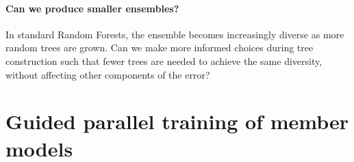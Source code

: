 \documentclass[
	twoside=false, %
]{kaobook}
\begin{document}
\paragraph{Can we produce smaller ensembles?} In standard Random Forests, the ensemble becomes increasingly diverse as more random trees are grown. Can we make more informed choices during tree construction such that fewer trees are needed to achieve the same diversity, without affecting other components of the error?












\pagebreak
\section{Guided parallel training of member models}
\label{sec:guided-parallel-training}


\end{document}
